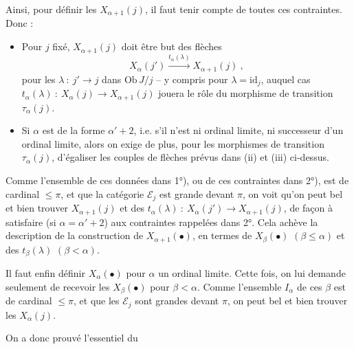 \documentclass[11pt]{article}
\newcommand{\printedpage}[1]{\marginpar{\footnotesize p.~#1}}
\newcommand{\msp}[1]{\marginpar{\footnotesize [#1]}}
\newcommand{\Ob}{\mathrm{Ob}\,}
\begin{document}
\msp{257}
Ainsi, pour définir les $X_{\alpha+1}(j)$, il faut tenir compte de toutes ces contraintes. Donc :
\begin{itemize}[leftmargin=3em]
\item[1°)] Pour $j$ fixé, $X_{\alpha+1}(j)$ doit être but des flèches
\[
X_\alpha(j') \xrightarrow{t_\alpha(\lambda)} X_{\alpha+1}(j)\ ,
\]
pour les $\lambda\ :\ j'\longrightarrow j$ dans $\Ob J/j$ -- y compris pour $\lambda=\mathrm{id}_j$, auquel cas $t_\alpha(\lambda)\ :\ X_\alpha(j)\longrightarrow X_{\alpha+1}(j)$ jouera le rôle du morphisme de transition $\tau_\alpha(j)$.
\item[2°)] Si $\alpha$ est de la forme $\alpha'+2$, i.e. s'il n'est ni ordinal limite, ni successeur d'un ordinal limite, alors on exige de plus, pour les morphismes de transition $\tau_\alpha(j)$, d'égaliser les couples de flèches prévus dans (ii) et (iii) ci-dessus.
\end{itemize}
Comme l'ensemble de ces données dans 1°), ou de ces contraintes dans 2°),
\msp{258}
est de cardinal $\leqslant\pi$, et que la catégorie $\mathcal{E}_j$ est grande devant $\pi$, on voit qu'on peut bel et bien trouver $X_{\alpha+1}(j)$ et des $t_\alpha(\lambda)\ :\ X_\alpha(j')\longrightarrow X_{\alpha+1}(j)$, de façon à satisfaire (si $\alpha=\alpha'{+}2$) aux contraintes rappelées dans 2°. Cela achève la description de la construction de $X_{\alpha+1}(\bullet)$, en termes de $X_\beta(\bullet)$ $(\beta\leqslant\alpha)$ et des $t_\beta(\lambda)$ $(\beta<\alpha)$.

Il faut enfin définir $X_\alpha(\bullet)$ pour $\alpha$ un ordinal limite. Cette fois, on lui demande seulement de recevoir les $X_\beta(\bullet)$ pour $\beta<\alpha$. Comme l'ensemble $I_\alpha$ de ces $\beta$ est de cardinal $\leqslant\pi$, et que les $\mathcal{E}_j$ sont grandes devant $\pi$, on peut bel et bien trouver les $X_\alpha(j)$.

\printedpage{98}
\msp{259}
On a donc prouvé l'essentiel du
\end{document}
